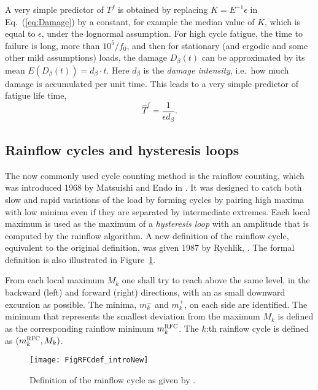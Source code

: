 A very simple predictor of $T^f$ is obtained by
replacing $K = E^{-1}\epsilon$ in Eq.~(\ref{eq:Damage}) by a constant,
for example the median value of $K$, which is equal to $\epsilon$, under the
lognormal assumption.
For high cycle fatigue, the time to failure is long, more than
$10^5/f_0$, and then for stationary (and ergodic and some other mild
assumptions) loads, the damage $D_\beta(t)$ can be approximated by its mean
$E(D_\beta(t))=d_\beta\cdot t$. Here $d_\beta$ is the {\em damage intensity},
i.e.\ how much damage is accumulated per unit time. This leads to
a very simple predictor of fatigue life time, 
\begin{equation}
\widehat T^f=\frac{1}{\epsilon d_\beta}.
\label{eq:fatiguelifetime}
\end{equation}

\subsection{Rainflow cycles and hysteresis loops}\label{sec:CCRainflow}

The now commonly used cycle counting method is the rainflow counting,
which was introduced 1968 by Matsuishi and Endo in
\cite{MatsuishiAndEndo1968Fatigue}. It was
designed to catch both slow and rapid variations of the load by
forming cycles by pairing high maxima with low minima even if they are
separated by intermediate extremes. Each local
maximum is used as the maximum of a {\it hysteresis loop} with an
amplitude that is computed by the rainflow algorithm.
A new definition of the rainflow cycle, equivalent to the original
definition, was given 1987 by Rychlik, \cite{Rychlik1987New}.
The formal definition is also illustrated in Figure~\ref{FigRFCdef}.
\begin{defi}\label{textRFCdef}
      From each local maximum $M_k$
      one shall try to reach above the same level, in the backward (left) and
      forward (right) directions, with an as small downward excursion as
      possible. The minima, $m_k^-$ and $m_k^+$, on each side are identified.
      The minimum that represents the smallest deviation from the maximum
      $M_k$ is defined as the corresponding rainflow minimum $m_k^{{\protect\mbox{\protect\small\protect\sc rfc}}}$.
      The $k$:th rainflow cycle is defined as $(m_k^{{\protect\mbox{\protect\small\protect\sc rfc}}},M_k)$.
\end{defi}
      
\begin{figure}
  \centering
  \texttt{[image: FigRFCdef\_introNew]}
\vspace{-3mm}
  \caption[Definition of the rainflow cycle as given by Rychlik]
{Definition of the rainflow cycle as given by \cite{Rychlik1987New}.
      }
  \label{FigRFCdef}
\end{figure}

